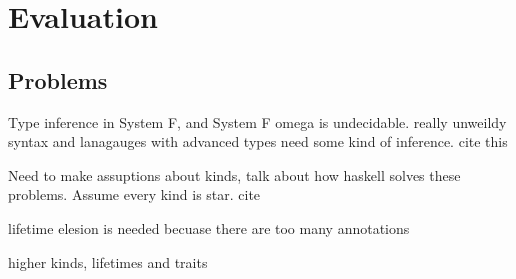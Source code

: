 \chapter{Evaluation}\label{sec:evaluation}

\section{Problems}
Type inference in System F, and System F omega is undecidable. really unweildy
syntax and lanagauges with advanced types need some kind of inference. cite this

Need to make assuptions about kinds, talk about how haskell solves these problems. Assume every kind is star.
cite

lifetime elesion is needed becuase there are too many annotations

higher kinds, lifetimes and traits
